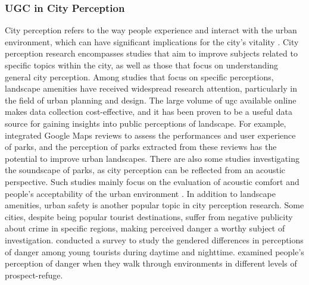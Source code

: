 \documentclass{article}
\begin{document}
\subsubsection{UGC in City Perception}
City perception refers to the way people experience and interact with the urban environment, which can have significant implications for the city's vitality \citep{jacobs_death_1961}. City perception research encompasses studies that aim to improve subjects related to specific topics within the city, as well as those that focus on understanding general city perception. Among studies that focus on specific perceptions, landscape amenities have received widespread research attention, particularly in the field of urban planning and design. The large volume of \acrshort{ugc} available online makes data collection cost-effective, and it has been proven to be a useful data source for gaining insights into public perceptions of landscape. For example, \cite{huang_user_2022} integrated Google Maps reviews to assess the performances and user experience of parks, and the perception of parks extracted from these reviews has the potential to improve urban landscapes. There are also some studies investigating the soundscape of parks, as city perception can be reflected from an acoustic perspective. Such studies mainly focus on the evaluation of acoustic comfort and people's acceptability of the urban environment \citep{tse_perception_2012, liu_effects_2014}. In addition to landscape amenities, urban safety is another popular topic in city perception research. Some cities, despite being popular tourist destinations, suffer from negative publicity about crime in specific regions, making perceived danger a worthy subject of investigation. \cite{carr_exploratory_2001} conducted a survey to study the gendered differences in perceptions of danger among young tourists during daytime and nighttime. \cite{andrews_variations_2010} examined people's perception of danger when they walk through environments in different levels of prospect-refuge.
\end{document}
